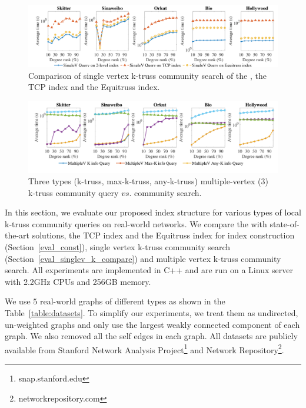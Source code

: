 \begin{figure}[h]
    \centering
    \includegraphics[width=1.0\textwidth]{./figures/singlev_k_compare_small.pdf}
    \caption{Comparison of single vertex k-truss community search of the \twolevelindex{}, the TCP index and the Equitruss index.}
    \label{fig:singlev_k_compare}
\end{figure}

\begin{figure}[h]
    \centering
    \includegraphics[width=1.0\linewidth]{./figures/multiplev_3_info_query_small.pdf}
    \caption{Three types (k-truss, max-k-truss, any-k-truss) multiple-vertex ($3$) \toplevelprob{} k-truss community query $vs.$ community search.}
    \label{fig:multiplev_3_info_query}
\end{figure}

In this section, we evaluate our proposed index structure for various types of local k-truss community queries on real-world networks. We compare the \twolevelindex{} with state-of-the-art solutions, the TCP index \cite{huang2014querying} and the Equitruss index \cite{akbas2017truss} for index construction (Section~\ref{eval_const}), single vertex k-truss community search (Section~\ref{eval_singlev_k_compare}) and multiple vertex k-truss community search. All experiments are implemented in C++ and are run on a Linux server with 2.2GHz CPUs and 256GB memory. 

We use $5$ real-world graphs of different types as shown in the Table~\ref{table:datasets}. To simplify our experiments, we treat them as undirected, un-weighted graphs and only use the largest weakly connected component of each graph. We also removed all the self edges in each graph. 
All datasets are publicly available from Stanford Network Analysis Project\footnote{snap.stanford.edu} and Network Repository\footnote{networkrepository.com}.

